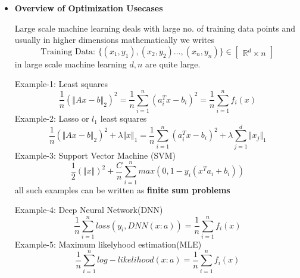 \documentclass[a4paper]{article}
\numberwithin{equation}{section}
\begin{document}
\begin{itemize}
\[\begin{tikzpicture}
    \draw[thick,black] (-1,0) -- (1,0);
    \draw[thick,black] (0,1) -- (0,-1);

    \draw(0.5,0.5) node[]{$2$};
    \draw(-0.5,0.5) node[]{$1$};
    \draw(0.5,-0.5) node[]{$8$};
    \draw(-0.5,-0.5) node[]{$4$};

    \draw(-1,0.5) node[left]{$x_1$};
    \draw(-1,-0.5) node[left]{$x_2$};
    \draw(-0.5,1) node[above]{$y_1$};
    \draw(0.5,1) node[above]{$y_2$};


\end{tikzpicture}
\]
$x$ is going to play row wise while $y$ coloumn wise such that $x$ wants to minimize the sum of rows and $y$ wants to maximize the sum of columns

\textbf{Note:} it is zero sum game whatever one pays goes to other person only
\pagebreak
\begin{center}
    \textbf{\Huge{Lecture-20}}
\end{center}
\begin{center}
    \textbf{Prof. Suvrit Sra}
\end{center}
\item \textbf{Overview of Optimization Usecases}

Large scale machine learning deals with large no. of training data points and usually in higher dimensions mathematically we writes
\[\text{Training Data: } \{(x_1,y_1),(x_2,y_2)\dots,(x_n,y_n)\} \in \begin{bmatrix}
    \mathbb{R}^d \times n
\end{bmatrix}\]
in large scale machine learning $d,n$ are quite large.

Example-1: Least squares
\[\frac{1}{n}\left(\Vert Ax-b\Vert_2\right)^2=\frac{1}{n}\sum_{i=1}^{n}\left(a_i^Tx-b_i\right)^2=\frac{1}{n}\sum_{i=1}^{n}f_i(x)\]
Example-2: Lasso or $l_1$ least squares
\[\frac{1}{n}\left(\Vert Ax-b\Vert_2\right)^2+\lambda\Vert x\Vert_1=\frac{1}{n}\sum_{i=1}^{n}\left(a_i^Tx-b_i\right)^2+\lambda \sum_{j=1}^{d}\Vert x_j\Vert_1\]
Example-3: Support Vector Machine (SVM)
\[\frac{1}{2}(\Vert x\Vert)^2+\frac{C}{n}\sum_{i=1}^{n}max\left(0,1-y_i(x^Ta_i+b_i)\right)\]
all such examples can be written as \textbf{finite sum problems}

Example-4: Deep Neural Network(DNN)
\[\frac{1}{n}\sum_{i=1}^{n}loss\left(y_i,DNN(x:a)\right)=\frac{1}{n}\sum_{i=1}^{n}f_i(x)\]
Example-5: Maximum likelyhood estimation(MLE)
\[\frac{1}{n}\sum_{i=1}^{n}log-likelihood\left(x:a\right)=\frac{1}{n}\sum_{i=1}^{n}f_i(x)\]


\end{itemize}
\end{document}
